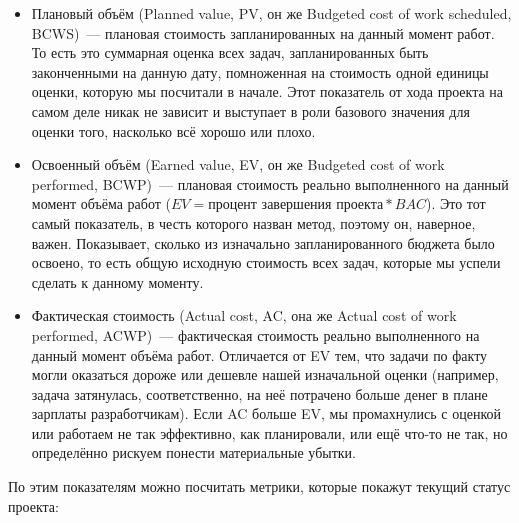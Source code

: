 \documentclass{../../text-style}
\begin{document}
\begin{itemize}
    \item Плановый объём (Planned value, PV, он же Budgeted cost of work scheduled, BCWS)~--- плановая стоимость запланированных на данный момент работ. То есть это суммарная оценка всех задач, запланированных быть законченными на данную дату, помноженная на стоимость одной единицы оценки, которую мы посчитали в начале. Этот показатель от хода проекта на самом деле никак не зависит и выступает в роли базового значения для оценки того, насколько всё хорошо или плохо.
    \item Освоенный объём (Earned value, EV, он же Budgeted cost of work performed, BCWP)~--- плановая стоимость реально выполненного на данный момент объёма работ ($EV = \text{процент завершения проекта} * BAC$). Это тот самый показатель, в честь которого назван метод, поэтому он, наверное, важен. Показывает, сколько из изначально запланированного бюджета было освоено, то есть общую исходную стоимость всех задач, которые мы успели сделать к данному моменту.
    \item Фактическая стоимость (Actual cost, AC, она же Actual cost of work performed, ACWP)~--- фактическая стоимость реально выполненного на данный момент объёма работ. Отличается от EV тем, что задачи по факту могли оказаться дороже или дешевле нашей изначальной оценки (например, задача затянулась, соответственно, на неё потрачено больше денег в плане зарплаты разработчикам). Если AC больше EV, мы промахнулись с оценкой или работаем не так эффективно, как планировали, или ещё что-то не так, но определённо рискуем понести материальные убытки.
\end{itemize}

По этим показателям можно посчитать метрики, которые покажут текущий статус проекта:
\end{document}
